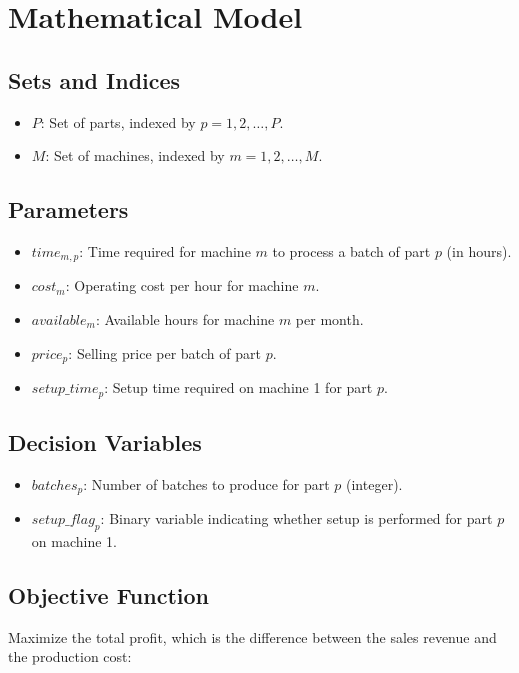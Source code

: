 \documentclass{article}
\begin{document}
\section*{Mathematical Model}

\subsection*{Sets and Indices}
\begin{itemize}
    \item $P$: Set of parts, indexed by $p = 1, 2, \ldots, P$.
    \item $M$: Set of machines, indexed by $m = 1, 2, \ldots, M$.
\end{itemize}

\subsection*{Parameters}
\begin{itemize}
    \item $time_{m,p}$: Time required for machine $m$ to process a batch of part $p$ (in hours).
    \item $cost_{m}$: Operating cost per hour for machine $m$.
    \item $available_{m}$: Available hours for machine $m$ per month.
    \item $price_{p}$: Selling price per batch of part $p$.
    \item $setup\_time_{p}$: Setup time required on machine 1 for part $p$.
\end{itemize}

\subsection*{Decision Variables}
\begin{itemize}
    \item $batches_{p}$: Number of batches to produce for part $p$ (integer).
    \item $setup\_flag_{p}$: Binary variable indicating whether setup is performed for part $p$ on machine 1.
\end{itemize}

\subsection*{Objective Function}
Maximize the total profit, which is the difference between the sales revenue and the production cost:
\end{document}
